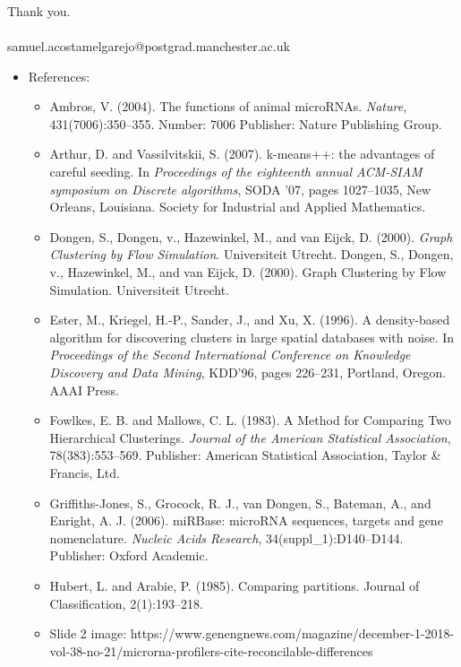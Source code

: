 \documentclass{beamer}
\begin{document}
\begin{frame}
\frametitle{}
\begin{center}
\LARGE
Thank you.
\footnotesize
\\~\\
samuel.acostamelgarejo@postgrad.manchester.ac.uk
\end{center}
\footnotesize
\begin{itemize}
\item References:
\begin{itemize}
\tiny
\item Ambros, V. (2004). The functions of animal microRNAs. \textit{Nature}, 431(7006):350–355. Number: 7006 Publisher: Nature
Publishing Group.\\
\item Arthur, D. and Vassilvitskii, S. (2007). k-means++: the advantages of careful seeding. In \textit{Proceedings of the eighteenth annual ACM-SIAM symposium on Discrete algorithms}, SODA ’07, pages 1027–1035, New Orleans, Louisiana. Society for Industrial and Applied Mathematics.
\item Dongen, S., Dongen, v., Hazewinkel, M., and van Eijck, D. (2000). \textit{Graph Clustering by Flow Simulation}. Universiteit Utrecht. Dongen, S., Dongen, v., Hazewinkel, M., and van Eijck, D. (2000). Graph Clustering by Flow Simulation. Universiteit Utrecht.
\item Ester, M., Kriegel, H.-P., Sander, J., and Xu, X. (1996). A density-based algorithm for discovering clusters in large spatial databases with noise. In \textit{Proceedings of the Second International Conference on Knowledge Discovery and Data Mining}, KDD’96, pages 226–231, Portland, Oregon. AAAI Press.
\item Fowlkes, E. B. and Mallows, C. L. (1983). A Method for Comparing Two Hierarchical Clusterings. \textit{Journal of the American Statistical Association}, 78(383):553–569. Publisher: American Statistical Association, Taylor \& Francis, Ltd.
\item Griffiths-Jones, S., Grocock, R. J., van Dongen, S., Bateman, A., and Enright, A. J. (2006). miRBase: microRNA sequences, targets and gene nomenclature. \textit{Nucleic Acids Research}, 34(suppl\_1):D140–D144. Publisher: Oxford Academic.
\item Hubert, L. and Arabie, P. (1985). Comparing partitions. Journal of Classification, 2(1):193–218.
\item Slide 2 image: https://www.genengnews.com/magazine/december-1-2018-vol-38-no-21/microrna-profilers-cite-reconcilable-differences

\end{itemize}
\end{itemize}
\end{frame}
\end{document}

